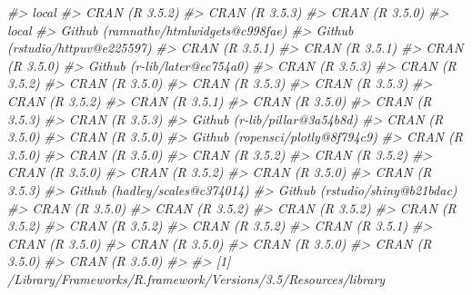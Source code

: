 \documentclass[
  12pt,
]{krantz}
\newenvironment{Shaded}{\begin{snugshade}}{\end{snugshade}}
\newcommand{\CommentTok}[1]{\textcolor[rgb]{0.56,0.35,0.01}{\textit{#1}}}
\begin{document}
\begin{Shaded}
\begin{Highlighting}[]
\CommentTok{#>  local                                }
\CommentTok{#>  CRAN (R 3.5.2)                       }
\CommentTok{#>  CRAN (R 3.5.3)                       }
\CommentTok{#>  CRAN (R 3.5.0)                       }
\CommentTok{#>  local                                }
\CommentTok{#>  Github (ramnathv/htmlwidgets@c998fae)}
\CommentTok{#>  Github (rstudio/httpuv@e225597)      }
\CommentTok{#>  CRAN (R 3.5.1)                       }
\CommentTok{#>  CRAN (R 3.5.1)                       }
\CommentTok{#>  CRAN (R 3.5.0)                       }
\CommentTok{#>  Github (r-lib/later@ec754a0)         }
\CommentTok{#>  CRAN (R 3.5.3)                       }
\CommentTok{#>  CRAN (R 3.5.2)                       }
\CommentTok{#>  CRAN (R 3.5.0)                       }
\CommentTok{#>  CRAN (R 3.5.3)                       }
\CommentTok{#>  CRAN (R 3.5.3)                       }
\CommentTok{#>  CRAN (R 3.5.2)                       }
\CommentTok{#>  CRAN (R 3.5.1)                       }
\CommentTok{#>  CRAN (R 3.5.0)                       }
\CommentTok{#>  CRAN (R 3.5.3)                       }
\CommentTok{#>  CRAN (R 3.5.3)                       }
\CommentTok{#>  Github (r-lib/pillar@3a54b8d)        }
\CommentTok{#>  CRAN (R 3.5.0)                       }
\CommentTok{#>  CRAN (R 3.5.0)                       }
\CommentTok{#>  Github (ropensci/plotly@8f794c9)     }
\CommentTok{#>  CRAN (R 3.5.0)                       }
\CommentTok{#>  CRAN (R 3.5.0)                       }
\CommentTok{#>  CRAN (R 3.5.2)                       }
\CommentTok{#>  CRAN (R 3.5.2)                       }
\CommentTok{#>  CRAN (R 3.5.0)                       }
\CommentTok{#>  CRAN (R 3.5.2)                       }
\CommentTok{#>  CRAN (R 3.5.0)                       }
\CommentTok{#>  CRAN (R 3.5.3)                       }
\CommentTok{#>  Github (hadley/scales@c374014)       }
\CommentTok{#>  Github (rstudio/shiny@b21bdac)       }
\CommentTok{#>  CRAN (R 3.5.0)                       }
\CommentTok{#>  CRAN (R 3.5.2)                       }
\CommentTok{#>  CRAN (R 3.5.2)                       }
\CommentTok{#>  CRAN (R 3.5.2)                       }
\CommentTok{#>  CRAN (R 3.5.2)                       }
\CommentTok{#>  CRAN (R 3.5.2)                       }
\CommentTok{#>  CRAN (R 3.5.1)                       }
\CommentTok{#>  CRAN (R 3.5.0)                       }
\CommentTok{#>  CRAN (R 3.5.0)                       }
\CommentTok{#>  CRAN (R 3.5.0)                       }
\CommentTok{#>  CRAN (R 3.5.0)                       }
\CommentTok{#>  CRAN (R 3.5.0)                       }
\CommentTok{#> }
\CommentTok{#> [1] /Library/Frameworks/R.framework/Versions/3.5/Resources/library}
\end{Highlighting}
\end{Shaded}
\end{document}
